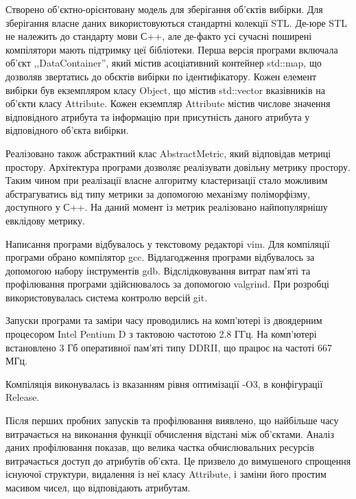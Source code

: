             
            Створено об'єктно-орієнтовану модель для зберігання об'єктів вибірки. Для зберігання власне даних використовуються стандартні колекції STL. Де-юре STL не належить до стандарту мови С++, але де-факто усі сучасні поширені компілятори мають підтримку цеї бібліотеки. Перша версія програми включала об'єкт ,,DataContainer'', який містив асоціативний контейнер std::map, що дозволяв звертатись до обєктів вибірки по ідентифікатору. Кожен елемент вибірки був екземпляром класу Object, що містив std::vector вказівників на об'єкти класу Attribute. Кожен екземпляр Attribute містив числове значення відповідного атрибута та інформацію при присутність даного атрибута у відповідного об'єкта вибірки.
            
            Реалізовано також абстрактний клас AbstractMetric, який відповідав метриці простору. Архітектура програми дозволяє реалізувати довільну метрику простору. Таким чином при реалізації власне алгоритму кластеризації стало можливим абстрагуватись від типу метрики за допомогою механізму поліморфізму, доступного у С++. На даний момент із метрик реалізовано найпопулярнішу евклідову метрику.
            
            Написання програми відбувалось у текстовому редакторі vim. Для компіляції програми обрано компілятор gcc. Відлагодження програми відбувалось за допомогою набору інструментів gdb. Відслідковування витрат пам'яті та профілювання програми здійснювалось за допомогою valgrind. При розробці використовувалась система контролю версій git.
            
            Запуски програми та заміри часу проводились на комп’ютері із двоядерним процесором Intel Pentium D з тактовою частотою 2.8 ГГц. На комп’ютері встановлено 3 Гб оперативної пам’яті типу DDRII, що працює на частоті 667 МГц.
            
            Компіляція виконувалась із вказанням рівня оптимізації -O3, в конфігурації Release.
            
            Після перших пробних запусків та профілювання виявлено, що найбільше часу витрачається на виконання функції обчислення відстані між об'єктами. Аналіз даних профілювання показав, що велика частка обчислювальних ресурсів витрачається доступ до атрибутів об'єкта. Це призвело до вимушеного спрощення існуючої структури, видалення із неї класу Attribute, і заміни його простим масивом чисел, що відповідають атрибутам. 
            
